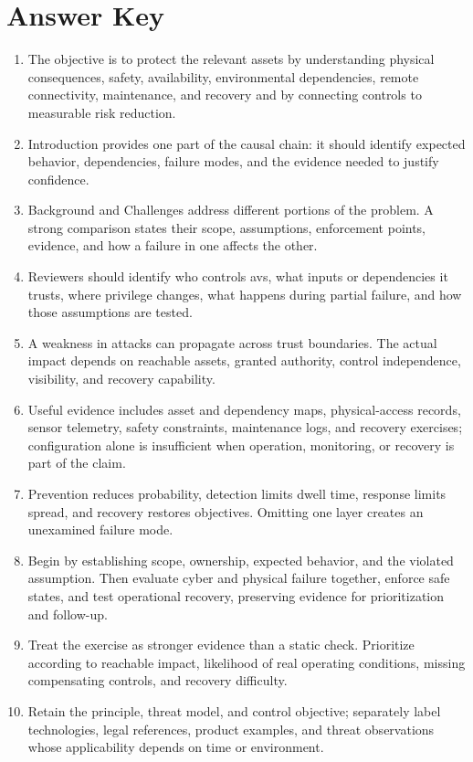 \documentclass[11pt]{article}
\begin{document}
\section*{Answer Key}
\begin{enumerate}
\item The objective is to protect the relevant assets by understanding physical consequences, safety, availability, environmental dependencies, remote connectivity, maintenance, and recovery and by connecting controls to measurable risk reduction.
\item Introduction provides one part of the causal chain: it should identify expected behavior, dependencies, failure modes, and the evidence needed to justify confidence.
\item Background and Challenges address different portions of the problem. A strong comparison states their scope, assumptions, enforcement points, evidence, and how a failure in one affects the other.
\item Reviewers should identify who controls avs, what inputs or dependencies it trusts, where privilege changes, what happens during partial failure, and how those assumptions are tested.
\item A weakness in attacks can propagate across trust boundaries. The actual impact depends on reachable assets, granted authority, control independence, visibility, and recovery capability.
\item Useful evidence includes asset and dependency maps, physical-access records, sensor telemetry, safety constraints, maintenance logs, and recovery exercises; configuration alone is insufficient when operation, monitoring, or recovery is part of the claim.
\item Prevention reduces probability, detection limits dwell time, response limits spread, and recovery restores objectives. Omitting one layer creates an unexamined failure mode.
\item Begin by establishing scope, ownership, expected behavior, and the violated assumption. Then evaluate cyber and physical failure together, enforce safe states, and test operational recovery, preserving evidence for prioritization and follow-up.
\item Treat the exercise as stronger evidence than a static check. Prioritize according to reachable impact, likelihood of real operating conditions, missing compensating controls, and recovery difficulty.
\item Retain the principle, threat model, and control objective; separately label technologies, legal references, product examples, and threat observations whose applicability depends on time or environment.
\end{enumerate}
\end{document}
